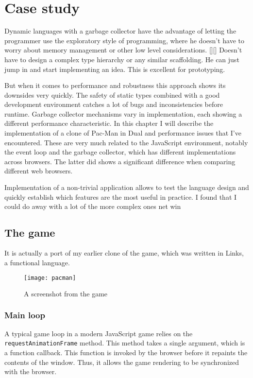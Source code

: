 \chapter{Case study}\label{chap:case}
Dynamic languages with a garbage collector have the advantage of letting the
programmer use the exploratory style of programming, where he doesn't have to
worry about memory management or other low level considerations. [][] Doesn't
have to design a complex type hierarchy or any similar scaffolding. He can just
jump in and start implementing an idea. This is excellent for prototyping.

But when it comes to performance and robustness this approach shows its
downsides very quickly. The safety of static types combined with a good
development environment catches a lot of bugs and inconsistencies before
runtime. Garbage collector mechanisms vary in implementation, each showing a
different performance characteristic. In this chapter I will describe the
implementation of a clone of Pac-Man in Dual and performance issues that I've
encountered. These are very much related to the JavaScript environment, notably
the event loop and the garbage collector, which has different implementations
across browsers. The latter did shows a significant difference when comparing
different web browsers.

Implementation of a non-trivial application allows to test the language design
and quickly establish which features are the most useful in practice.  I found
that I could do away with a lot of the more complex ones %
net win

\section{The game}
It is actually a port of my earlier clone of the game, which was written in
Links\cite{links_site}, a functional language.

\begin{figure}[h!]
\centering \texttt{[image: pacman]}
\caption{A screenshot from the game}
\label{fig:pacman}
\end{figure}

\subsection{Main loop}
A typical game loop in a modern JavaScript
game\cite{mdn_game_anatomy}
relies on the \texttt{requestAnimationFrame}
method\cite{mdn_requestanimationframe}. This
method takes a single argument, which is a function callback. This function is
invoked by the browser before it repaints the contents of the window. Thus, it
allows the game rendering to be synchronized with the browser.

